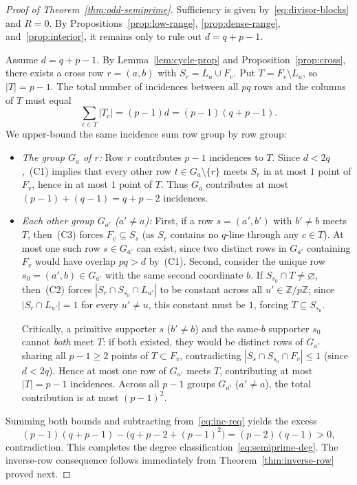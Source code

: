 \documentclass[11pt,reqno]{amsart}
\numberwithin{equation}{section}
\theoremstyle{definition}
\theoremstyle{remark}
\newcommand{\Z}{\mathbb{Z}}
\begin{document}
\begin{proof}[Proof of Theorem~\ref{thm:odd-semiprime}]
Sufficiency is given by~\eqref{eq:divisor-blocks} and $R=0$. By Propositions~\ref{prop:low-range}, \ref{prop:dense-range}, and~\ref{prop:interior}, it remains only to rule out $d=q+p-1$.

Assume $d=q+p-1$. By Lemma~\ref{lem:cycle-prop} and Proposition~\ref{prop:cross}, there exists a cross row $r=(a,b)$ with $S_r=L_u\cup F_v$. Put $T=F_v\setminus L_u$, so $|T|=p-1$. The total number of incidences between all $pq$ rows and the columns of $T$ must equal
\begin{equation}
\label{eq:inc-req}
\sum_{c\in T}|T_c| = (p-1)d = (p-1)(q+p-1).
\end{equation}
We upper-bound the same incidence sum row group by row group:
\begin{itemize}[leftmargin=1.5em]
\item \emph{The group $G_a$ of $r$:} Row $r$ contributes $p-1$ incidences to $T$. Since $d<2q$,~(C1) implies that every other row $t\in G_a\setminus\{r\}$ meets $S_r$ in at most $1$ point of $F_v$, hence in at most $1$ point of $T$. Thus $G_a$ contributes at most $(p-1)+(q-1)=q+p-2$ incidences.
\item \emph{Each other group $G_{a'}$ ($a'\neq a$):} First, if a row $s=(a',b')$ with $b'\neq b$ meets $T$, then~(C3) forces $F_v\subseteq S_s$ (as $S_r$ contains no $q$-line through any $c\in T$). At most one such row $s\in G_{a'}$ can exist, since two distinct rows in $G_{a'}$ containing $F_v$ would have overlap $pq>d$ by~(C1). Second, consider the unique row $s_0=(a',b)\in G_{a'}$ with the same second coordinate $b$. If $S_{s_0}\cap T\neq\varnothing$, then~(C2) forces $|S_r\cap S_{s_0}\cap L_{u'}|$ to be constant across all $u'\in\Z/p\Z$; since $|S_r\cap L_{u'}|=1$ for every $u'\neq u$, this constant must be $1$, forcing $T\subseteq S_{s_0}$.

Critically, a primitive supporter $s$ ($b'\neq b$) and the same-$b$ supporter $s_0$ cannot \emph{both} meet $T$: if both existed, they would be distinct rows of $G_{a'}$ sharing all $p-1\ge 2$ points of $T\subset F_v$, contradicting $|S_s\cap S_{s_0}\cap F_v|\le 1$ (since $d<2q$). Hence at most one row of $G_{a'}$ meets $T$, contributing at most $|T|=p-1$ incidences. Across all $p-1$ groups $G_{a'}$ ($a'\neq a$), the total contribution is at most $(p-1)^2$.
\end{itemize}
Summing both bounds and subtracting from~\eqref{eq:inc-req} yields the excess
\[
(p-1)(q+p-1) - \bigl(q+p-2 + (p-1)^2\bigr) = (p-2)(q-1) > 0,
\]
contradiction. This completes the degree classification~\eqref{eq:semiprime-deg}. The inverse-row consequence follows immediately from Theorem~\ref{thm:inverse-row} proved next.
\end{proof}
\end{document}
